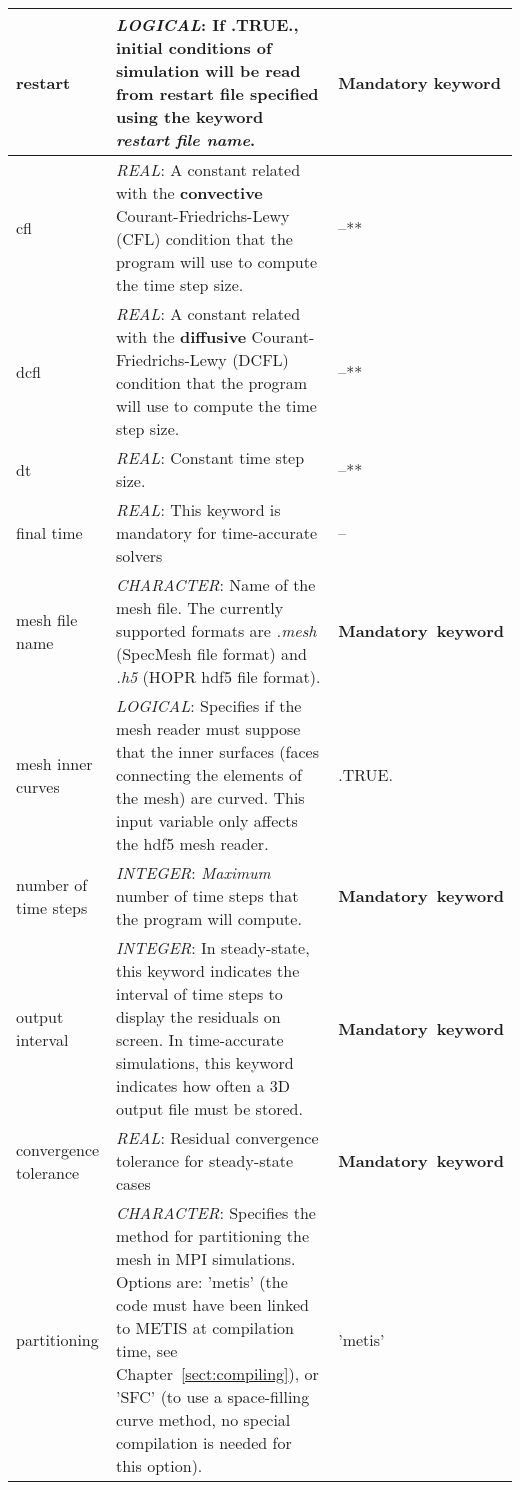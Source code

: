 \documentclass[a4paper,10pt]{report}
\begin{document}
\begin{longtable}{|p{4cm}|p{10cm}|p{2.2cm}|}
restart 			& \textit{LOGICAL}: If .TRUE., initial conditions of simulation will be read from restart file specified using the keyword \textit{restart file name}. & \textbf{Mandatory keyword} \\ \hline

cfl & \textit{REAL}: A constant related with the \textbf{convective} Courant-Friedrichs-Lewy (CFL) condition that the program will use to compute the time step size. & --** \\ \hline

dcfl & \textit{REAL}: A constant related with the \textbf{diffusive} Courant-Friedrichs-Lewy (DCFL) condition that the program will use to compute the time step size. & --** \\ \hline

dt  & \textit{REAL}: Constant time step size.  & --** \\ \hline

final time  & \textit{REAL}: This keyword is mandatory for time-accurate solvers & -- \\ \hline

mesh file name & \textit{CHARACTER}: Name of the mesh file. The currently supported formats are \textit{.mesh} (SpecMesh file format) and \textit{.h5} (HOPR hdf5 file format). & \textbf{Mandatory\ keyword} \\ \hline

mesh inner curves & \textit{LOGICAL}: Specifies if the mesh reader must suppose that the inner surfaces (faces connecting the elements of the mesh) are curved. This input variable only affects the hdf5 mesh reader. & .TRUE. \\ \hline

number of time steps & \textit{INTEGER}: \textit{Maximum} number of time steps that the program will compute.  & \textbf{Mandatory\ keyword} \\ \hline

output interval   & \textit{INTEGER}: In steady-state, this keyword indicates the interval of time steps to display the residuals on screen. In time-accurate simulations, this keyword indicates how often a 3D output file must be stored.  & \textbf{Mandatory\ keyword} \\ \hline

convergence tolerance & \textit{REAL}: Residual convergence tolerance for steady-state cases & \textbf{Mandatory\ keyword} \\ \hline

partitioning  & \textit{CHARACTER}: Specifies the method for partitioning the mesh in MPI simulations. Options are: 'metis' (the code must have been linked to METIS at compilation time, see Chapter~\ref{sect:compiling}), or 'SFC' (to use a space-filling curve method, no special compilation is needed for this option). & 'metis' \\ \hline


\end{longtable}
\end{document}
